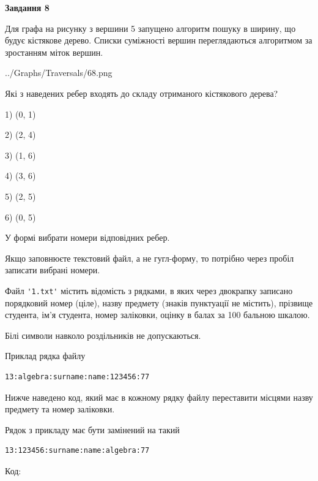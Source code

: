 \documentclass[12pt, ukrainian]{article}
\def\code#1{\Verb!#1!}
\begin{document}
{\begin {large}
{\begin {center}\textbf{Завдання 8}\end {center}}\par
Для графа на рисунку з вершини 5 запущено алгоритм пошуку в ширину, що будує кістякове дерево. Списки суміжності вершин переглядаються алгоритмом за зростанням міток вершин.\par
\begin{center}
	{../Graphs/Traversals/68.png}
\end{center}
\par Які з наведених ребер входять до складу отриманого кістякового дерева?\par
1) (0, 1)\par
2) (2, 4)\par
3) (1, 6)\par
4) (3, 6)\par
5) (2, 5)\par
6) (0, 5)\par
{\vskip 15pt} У формі вибрати номери відповідних ребер.


Якщо заповнюєте текстовий файл, а не гугл-форму, то потрібно через пробіл записа\-ти вибрані номери.\par
\newpage


Файл \code{'1.txt'} містить відомість з рядками, в яких через двокрапку записано поряд\-ковий номер (ціле), назву предмету (знаків пунктуації не містить), прізвище студента, ім'я студента, номер заліковки, оцінку в балах за 100 бальною шкалою.

Білі символи навколо роздільників не допускаються.

Приклад рядка файлу



\begin{verbatim}
13:algebra:surname:name:123456:77
\end{verbatim}


Нижче наведено код, який має в кожному рядку файлу переставити місцями назву предмету та номер заліковки.

Рядок з прикладу має бути замінений на такий



\begin{verbatim}
13:123456:surname:name:algebra:77
\end{verbatim}




Код:




\end{large}}
\end{document}
